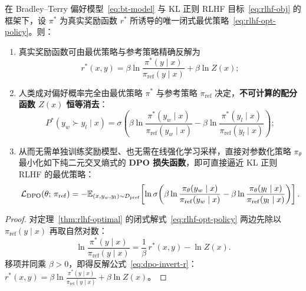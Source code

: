 \begin{thmBox}
\begin{theorem}
\label{thm:dpo-derivation}
在 Bradley--Terry 偏好模型~\eqref{eq:bt-model} 与 KL 正则 RLHF 目标~\eqref{eq:rlhf-obj} 的框架下，设 $\pi^*$ 为真实奖励函数 $r^*$ 所诱导的唯一闭式最优策略~\eqref{eq:rlhf-opt-policy}。则：
\begin{enumerate}
  \item 真实奖励函数可由最优策略与参考策略精确反解为
  \begin{equation}
    r^*(x, y) = \beta \ln \frac{\pi^*(y \mid x)}{\pi_{\mathrm{ref}}(y \mid x)} + \beta \ln Z(x);
    \label{eq:dpo-invert-r}
  \end{equation}
  \item 人类成对偏好概率完全由最优策略 $\pi^*$ 与参考策略 $\pi_{\mathrm{ref}}$ 决定，\textbf{不可计算的配分函数 $Z(x)$ 恒等消去}：
  \begin{equation}
    P^*(y_w \succ y_l \mid x)
    = \sigma\!\left(\beta \ln \frac{\pi^*(y_w \mid x)}{\pi_{\mathrm{ref}}(y_w \mid x)} - \beta \ln \frac{\pi^*(y_l \mid x)}{\pi_{\mathrm{ref}}(y_l \mid x)}\right);
    \label{eq:dpo-bt-policy}
  \end{equation}
  \item 从而无需单独训练奖励模型、也无需在线强化学习采样，直接对参数化策略 $\pi_\theta$ 最小化如下纯二元交叉熵式的 \textbf{DPO 损失函数}，即可直接逼近 KL 正则 RLHF 的最优策略：
  \begin{equation}
    \mathcal{L}_{\mathrm{DPO}}(\theta;\, \pi_{\mathrm{ref}})
    = -\mathbb{E}_{(x, y_w, y_l) \sim \mathcal{D}_{\mathrm{pref}}}\!\left[
      \ln \sigma\!\left(
        \beta \ln \frac{\pi_\theta(y_w \mid x)}{\pi_{\mathrm{ref}}(y_w \mid x)}
        - \beta \ln \frac{\pi_\theta(y_l \mid x)}{\pi_{\mathrm{ref}}(y_l \mid x)}
      \right)
    \right].
    \label{eq:dpo-loss}
  \end{equation}
\end{enumerate}
\end{theorem}
\begin{proof}
对定理~\ref{thm:rlhf-optimal} 的闭式解式~\eqref{eq:rlhf-opt-policy} 两边先除以 $\pi_{\mathrm{ref}}(y \mid x)$ 再取自然对数：
\[
  \ln \frac{\pi^*(y \mid x)}{\pi_{\mathrm{ref}}(y \mid x)} = \frac{1}{\beta}\,r^*(x, y) - \ln Z(x).
\]
移项并同乘 $\beta > 0$，即得反解公式~\eqref{eq:dpo-invert-r}：$r^*(x, y) = \beta \ln \frac{\pi^*(y\mid x)}{\pi_{\mathrm{ref}}(y\mid x)} + \beta \ln Z(x)$。


\end{proof}
\end{thmBox}
